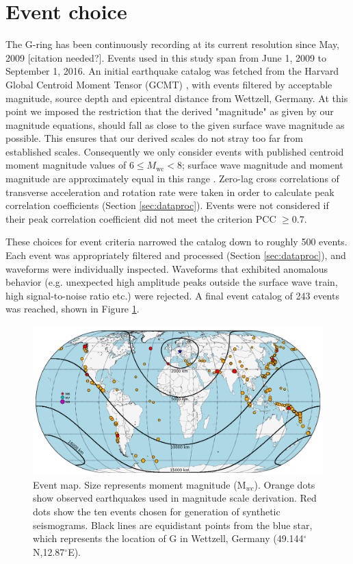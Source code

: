 \documentclass{gji}
\begin{document}
\section{Event choice}
The G-ring has been continuously recording at its current resolution since May, 2009 [citation needed?]. 
Events used in this study span from June 1, 2009 to September 1, 2016. An initial earthquake catalog was fetched from the Harvard Global Centroid Moment Tensor (GCMT) \cite{ekstrom2012global},
with events filtered by acceptable magnitude, source depth and epicentral distance from Wettzell, Germany. At this point we imposed the restriction that the derived 
"magnitude" as given by our magnitude equations, should fall as close to the given surface wave magnitude as possible. This ensures that our derived scales do not stray too far from established scales. Consequently we only consider events with published centroid moment magnitude values of $6 \le M_{\text{wc}} < 8$; surface wave magnitude and moment magnitude are approximately equal in this range \cite{shearer2009introduction}.
 Zero-lag cross correlations of transverse acceleration and rotation rate were taken in order to calculate peak correlation coefficients (Section \ref{sec:dataproc}). Events were not considered if their peak correlation coefficient did not meet the criterion PCC $\geq 0.7$. 

These choices for event criteria narrowed the catalog down to roughly 500 events. Each event was appropriately filtered and processed (Section \ref{sec:dataproc}), and waveforms were individually inspected. Waveforms that exhibited anomalous behavior (e.g. unexpected high amplitude peaks outside the surface wave train, high signal-to-noise ratio etc.) were rejected. A final event catalog of 243 events was reached, shown in Figure \ref{fig:event_map}.

\begin{figure}
\centerline{\includegraphics[width=.8\textwidth]{event_map}}
\caption{Event map. Size represents moment magnitude (M$_{wc}$). Orange dots show observed earthquakes used in magnitude scale derivation. Red dots show the ten events chosen for generation of synthetic seismograms. Black lines are equidistant points from the blue star, which represents the location of G in Wettzell, Germany (49.144$^\circ$N,12.87$^\circ$E).}
\label{fig:event_map}
\end{figure}
\end{document}
